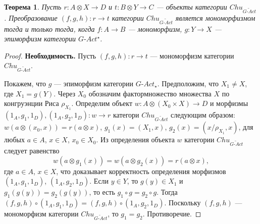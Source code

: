 \documentclass[a4paper,12pt]{article}
\newtheorem{theorem}{Теорема}
\newcommand{\GAct}{G\text{-}Act}
\begin{document}
\begin{theorem}\label{monomorphism-gact}
    Пусть $r: A \otimes X \to D$ и $t: B \otimes Y \to C$ --- объекты категории $Chu_{\widetilde{\GAct}}$. Преобразование $(f,g,h): r \to t$ категории $Chu_{\widetilde{\GAct}}$ является мономорфизмом тогда и только тогда, когда $f: A \to B$ --- мономорфизм, $g: Y \to X$ --- эпиморфизм категории $\GAct^{\star}$.
\end{theorem}
\begin{proof}
    \textbf{Необходимость.} Пусть $(f,g,h): r \to t$ --- мономорфизм категории $Chu_{\widetilde{\GAct}}$.

    Покажем, что $g$ --- эпиморфизм категории $\GAct_{\star}$. Предположим, что $X_1 \ne X$, где $X_1 = g(Y)$. Через $X_0$ обозначим фактормножество множества $X$ по конгруэнции Риса $\rho_{X_1}$. Определим объект $w: A \otimes (X_0 \times X) \to D$ и морфизмы $(1_A,g_1,1_D), (1_A,g_2,1_D): w \to r$ категори $Chu_{\widetilde{\GAct}}$ следующим образом: $w(a \otimes (x_0,x)) = r(a \otimes x)$, $g_1(x) = (X_1,x)$, $g_2(x) = (x/\rho_{X_1}, x)$, для любых $a \in A$, $x \in X$, $x_0 \in X_0$. Из определения объекта $w$ категории $Chu_{\widetilde{\GAct}}$ следует равенство
    $$
        w(a \otimes g_1(x)) = w(a \otimes g_2(x)) = r(a \otimes x),
    $$ 
    где $a \in A$, $x \in X$, что доказывает корректность определения морфизмов $(1_A,g_1,1_D)$, $(1_A,g_2,1_D)$. Если $y \in Y$, то $g(y) \in X_1$ и $g_1(g(y)) = g_2(g(y))$, то есть $g_1 \circ g = g_2 \circ g$. Тогда $(f,g,h) \circ (1_A,g_1,1_D) = (f,g,h) \circ (1_A,g_2,1_D)$. Поскольку $(f,g,h)$ --- мономорфизм категории $Chu_{\widetilde{\GAct}}$, то $g_1 = g_2$. Противоречие.


\end{proof}
\end{document}

